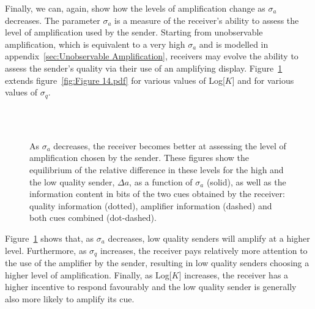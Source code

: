 \documentclass[a4paper,12pt]{article}
\numberwithin{equation}{section}
\numberwithin{figure}{section}
\begin{document}
Finally, we can, again, show how the levels of amplification change as $\sigma_{a}$ decreases. The parameter $\sigma_{a}$ is a measure of the receiver's ability to assess the level of amplification used by the sender. Starting from unobservable amplification, which is equivalent to a very high $\sigma_{a}$ and is modelled in appendix~\ref{sec:Unobservable Amplification}, receivers may evolve the ability to assess the sender's quality via their use of an amplifying display. Figure~\ref{fig:Figure 1314151617} extends figure~\ref{fig:Figure 14.pdf} for various values of Log[$K$] and for various values of $\sigma_{q}$.

\begin{figure}[h]
\vspace{-3mm}
\hfill
{}\\[-3mm]
\hfill
{}\\[-3mm]
\hfill
\begin{minipage}[t]{.5\textwidth}
\captionsetup{width=230pt}
\vspace{-45mm}
\caption[]{As $\sigma_{a}$ decreases, the receiver becomes better at assessing the level of amplification chosen by the sender. These figures show the equilibrium of the relative difference in these levels for the high and the low quality sender, $\Delta a$, as a function of $\sigma_{a}$ (solid), as well as the information content in bits of the two cues obtained by the receiver: quality information (dotted), amplifier information (dashed) and both cues combined (dot-dashed).}
\label{fig:Figure 1314151617}
\end{minipage}
\end{figure}

Figure~\ref{fig:Figure 1314151617} shows that, as $\sigma_{a}$ decreases, low quality senders will amplify at a higher level. Furthermore, as $\sigma_{q}$ increases, the receiver pays relatively more attention to the use of the amplifier by the sender, resulting in low quality senders choosing a higher level of amplification. Finally, as Log[$K$] increases, the receiver has a higher incentive to respond favourably and the low quality sender is generally also more likely to amplify its cue.
\end{document}
